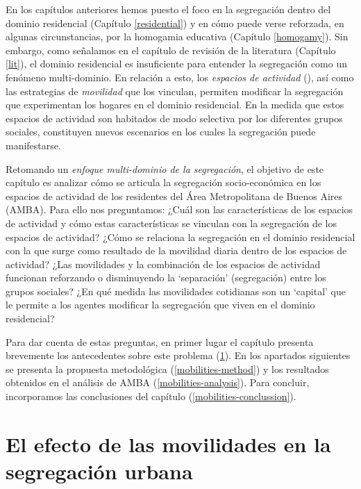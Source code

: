 \documentclass[
  spanish,
  a4paper,%
  chapterprefix=true,%
  DIV=calc,%
  twoside]{scrbook}%
\begin{document}
En los capítulos anteriores hemos puesto el foco en la segregación
dentro del dominio residencial (Capítulo \ref{residential}) y en cómo
puede verse reforzada, en algunas circunstancias, por la homogamia
educativa (Capítulo \ref{homogamy}). Sin embargo, como señalamos en el
capítulo de revisión de la literatura (Capítulo \ref{lit}), el dominio
residencial es insuficiente para entender la segregación como un
fenómeno multi-dominio. En relación a esto, los \emph{espacios de actividad}
(), así como las estrategias de \emph{movilidad} que los vinculan,
permiten modificar la segregación que experimentan los hogares en el
dominio residencial. En la medida que estos espacios de actividad son
habitados de modo selectiva por los diferentes grupos sociales,
constituyen nuevos escenarios en los cuales la segregación puede
manifestarse.

Retomando un \emph{enfoque multi-dominio de la segregación},
el objetivo de este capítulo es analizar cómo se
articula la segregación socio-económica en los espacios de actividad de
los residentes del Área Metropolitana de Buenos Aires (AMBA).
Para ello nos preguntamos: ¿Cuál son las
características de los espacios de actividad y cómo estas
características se vinculan con la segregación de los espacios de
actividad? ¿Cómo se relaciona la segregación en el dominio residencial
con la que surge como resultado de la movilidad diaria dentro de los
espacios de actividad? ¿Las movilidades y la combinación de los espacios
de actividad funcionan reforzando o disminuyendo la `separación'
(segregación) entre los grupos sociales? ¿En qué medida las movilidades
cotidianas son un `capital' que le permite a los agentes modificar la
segregación que viven en el dominio
residencial?

Para dar cuenta de estas preguntas, en primer lugar el capítulo
presenta brevemente los antecedentes
sobre este problema (\ref{mobilities-lit}). En los apartados siguientes
se presenta la propuesta metodológica (\ref{mobilities-method}) y los
resultados obtenidos en el análisis de AMBA
(\ref{mobilities-analysis}). Para concluir, incorporamos las
conclusiones del capítulo (\ref{mobilities-conclussion}).

\section{El efecto de las movilidades en la segregación urbana}\label{mobilities-lit}
\end{document}
